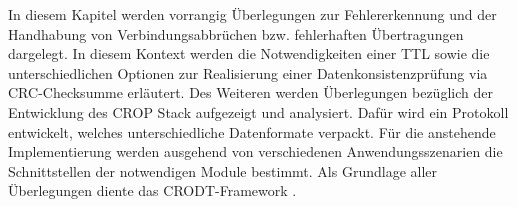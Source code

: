 \label{cap:konzept}

In diesem Kapitel werden vorrangig {\"U}berlegungen zur Fehlererkennung
und der Handhabung von Verbindungsabbr{\"u}chen bzw. fehlerhaften
{\"U}bertragungen dargelegt. In diesem Kontext werden die Notwendigkeiten einer
\gls{TTL} sowie die unterschiedlichen Optionen zur
Realisierung einer Datenkonsistenzpr{\"u}fung via CRC-Checksumme erl{\"a}utert.
Des Weiteren werden {\"U}berlegungen bez{\"u}glich der Entwicklung des
\gls{CROP} Stack aufgezeigt und analysiert. Dafür wird ein Protokoll entwickelt,
welches unterschiedliche Datenformate verpackt. Für die anstehende
Implementierung werden ausgehend von verschiedenen Anwendungsszenarien die
Schnittstellen der notwendigen Module bestimmt. Als Grundlage aller
{\"U}berlegungen diente das CRODT-Framework \cite{Daher}.
